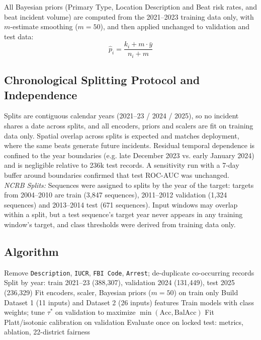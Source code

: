 \documentclass[runningheads]{llncs}
\begin{document}
All Bayesian priors (Primary Type, Location Description and Beat risk rates, and beat incident volume) are computed from the 2021--2023 training data only, with $m$-estimate smoothing ($m = 50$), and then applied unchanged to validation and test data:
\begin{equation}
\hat{p}_i = \frac{k_i + m \cdot \bar{y}}{n_i + m}
\end{equation}

\subsection{Chronological Splitting Protocol and Independence}
Splits are contiguous calendar years (2021--23 / 2024 / 2025), so no incident shares a date across splits, and all encoders, priors and scalers are fit on training data only. Spatial overlap across splits is expected and matches deployment, where the same beats generate future incidents. Residual temporal dependence is confined to the year boundaries (e.g. late December 2023 vs. early January 2024) and is negligible relative to 236k test records. A sensitivity run with a 7-day buffer around boundaries confirmed that test ROC-AUC was unchanged.\\
\textit{NCRB Splits:} Sequences were assigned to splits by the year of the target: targets from 2004--2010 are train (3,847 sequences), 2011--2012 validation (1,324 sequences) and 2013--2014 test (671 sequences). Input windows may overlap within a split, but a test sequence's target year never appears in any training window's target, and class thresholds were derived from training data only.

\subsection{Algorithm}
\begin{algorithm}[ht]
\caption{Leak-free incident classification}
\begin{algorithmic}[1]
\State Remove \texttt{Description}, \texttt{IUCR}, \texttt{FBI Code}, \texttt{Arrest}; de-duplicate co-occurring records
\State Split by year: train 2021--23 (388,307), validation 2024 (131,449), test 2025 (236,329)
\State Fit encoders, scaler, Bayesian priors ($m=50$) on train only
\State Build Dataset 1 (11 inputs) and Dataset 2 (26 inputs) features
\State Train models with class weights; tune $\tau^*$ on validation to maximize $\min(\text{Acc}, \text{BalAcc})$
\State Fit Platt/isotonic calibration on validation
\State Evaluate once on locked test: metrics, ablation, 22-district fairness
\end{algorithmic}
\end{algorithm}
\end{document}
